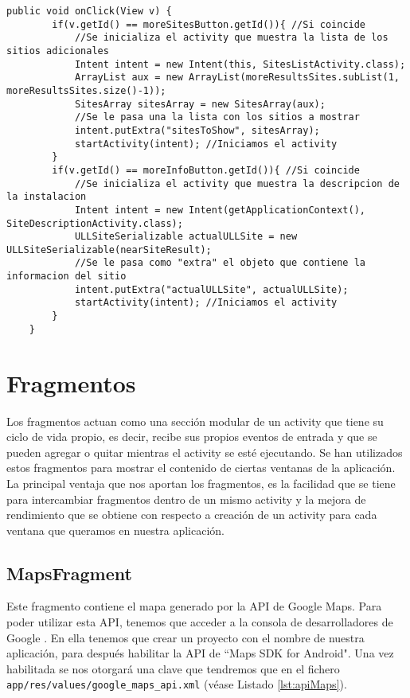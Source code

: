 \begin{lstlisting}[caption={Fichero \texttt{ARNavigation.java}, código para manejar los eventos de los botones.},  label={lst:infobutton}]
    public void onClick(View v) {
        if(v.getId() == moreSitesButton.getId()){ //Si coincide
            //Se inicializa el activity que muestra la lista de los sitios adicionales
            Intent intent = new Intent(this, SitesListActivity.class);
            ArrayList aux = new ArrayList(moreResultsSites.subList(1, moreResultsSites.size()-1));
            SitesArray sitesArray = new SitesArray(aux);
            //Se le pasa una la lista con los sitios a mostrar
            intent.putExtra("sitesToShow", sitesArray);
            startActivity(intent); //Iniciamos el activity
        }
        if(v.getId() == moreInfoButton.getId()){ //Si coincide
            //Se inicializa el activity que muestra la descripcion de la instalacion
            Intent intent = new Intent(getApplicationContext(), SiteDescriptionActivity.class);
            ULLSiteSerializable actualULLSite = new ULLSiteSerializable(nearSiteResult);
            //Se le pasa como "extra" el objeto que contiene la informacion del sitio
            intent.putExtra("actualULLSite", actualULLSite);
            startActivity(intent); //Iniciamos el activity
        }
    }
\end{lstlisting}


\section{Fragmentos}

Los fragmentos \cite{URL::fragment} actuan como una sección modular de un activity que tiene su ciclo de vida propio, es decir, recibe sus propios eventos de entrada y que se pueden agregar o quitar mientras el activity se esté ejecutando. Se han utilizados estos fragmentos para mostrar el contenido de ciertas ventanas de la aplicación. La principal ventaja que nos aportan los fragmentos, es la facilidad que se tiene para intercambiar fragmentos dentro de un mismo activity y la mejora de rendimiento que se obtiene con respecto a creación de un activity para cada ventana que queramos en nuestra aplicación.

\subsection{MapsFragment}
       
Este fragmento contiene el mapa generado por la API de Google Maps. Para poder utilizar esta API, tenemos que acceder a la consola de desarrolladores de Google \cite{URL::consoleGoogle}. En ella tenemos que crear un proyecto con el nombre de nuestra aplicación, para después habilitar la API de ``Maps SDK for Android". Una vez habilitada se nos otorgará una clave que tendremos que en el fichero \texttt{app/res/values/google\_maps\_api.xml} (véase Listado \ref{lst:apiMaps}).

